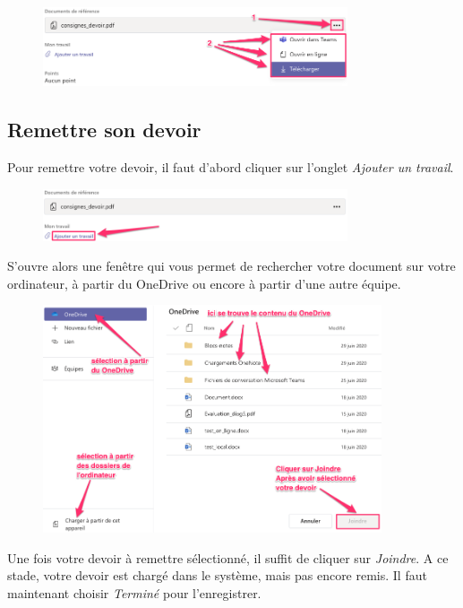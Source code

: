 \begin{figure}[h]
\includegraphics[width=9cm]{./images/teams/choix_pointilles}
\centering
\end{figure}

\subsection{Remettre son devoir}

Pour remettre votre devoir, il faut d'abord cliquer sur l'onglet \textit{Ajouter un travail}. 

\begin{figure}[H]
\includegraphics[width=9cm]{./images/teams/ajout}
\centering
\end{figure}

S'ouvre alors une fenêtre qui vous permet de rechercher votre document sur votre ordinateur, à partir du OneDrive ou encore à partir d'une autre équipe.

\begin{figure}[H]
\includegraphics[width=10cm]{./images/teams/selection_devoir}
\centering
\end{figure}

Une fois votre devoir à remettre sélectionné, il suffit de cliquer sur \textit{Joindre}. A ce stade, votre devoir est chargé dans le système, mais pas encore remis. Il faut maintenant choisir \textit{Terminé} pour l'enregistrer.

